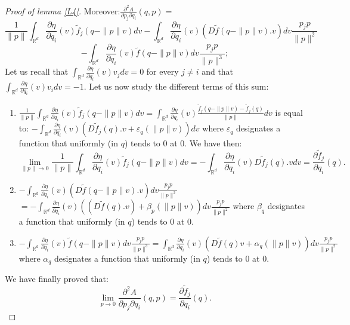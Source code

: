 \documentclass{dcds}
\theoremstyle{definition}
\begin{document}
\begin{proof}[Proof of lemma \ref{L4}]
  Moreover:$\frac{\partial^2A}{\partial p_j\partial q_i}(q,p)=$
$$ \frac{1}{\| p\|} \int_{{\mathbb {R}}^d}\frac{\partial\eta}{\partial q_i}(v)\tilde f_j(q-\| p\| v)dv-\int_{{\mathbb {R}}^d}\frac{\partial \eta}{\partial q_i}(v)(D\tilde f (q-\| p\|v).v)dv \frac{p_jp}{\| p\|^2}$$$$- \int_{{\mathbb {R}}^d}\frac{\partial\eta}{\partial q_i}(v)\tilde f(q-\| p\| v)dv\frac{p_jp}{\| p\|^3};$$
 Let us recall that
$\int_{{\mathbb {R}}^d}\frac{\partial \eta}{\partial q_i}(v)v_jdv=0$ for every $j\not=i$ and that $\int_{{\mathbb {R}}^d}\frac{\partial \eta}{\partial q_i}(v)v_idv=-1$. Let us now study the different terms of this sum:
\begin{enumerate}
\item $ \displaystyle{ \frac{1}{\| p\|} \int_{{\mathbb {R}}^d}\frac{\partial\eta}{\partial q_i}(v)\tilde f_j(q-\| p\| v)dv=   \int_{{\mathbb {R}}^d}\frac{\partial\eta}{\partial q_i}(v)\frac{\tilde f_j(q-\| p\| v)-\tilde f_j(q)}{\| p\|}dv}
$ is equal to:\break
$\displaystyle{-\int_{{\mathbb {R}}^d}\frac{\partial\eta}{\partial q_i}(v)  \left(D\tilde f_j(q).v+\varepsilon_q (\|p\| v) \right) dv
}$ where $\varepsilon_q$ designates a function that uniformly (in $q$) tends to $0$ at $0$. We have then:
$$\lim_{\| p\|\rightarrow 0}\frac{1}{\| p\|} \int_{{\mathbb {R}}^d}\frac{\partial\eta}{\partial q_i}(v)\tilde f_j(q-\| p\| v)dv=
-\int_{{\mathbb {R}}^d}\frac{\partial\eta}{\partial q_i}(v)   D\tilde f_j(q).v dv=\frac{\partial \tilde f_j}{\partial q_i}(q).$$
\item$\displaystyle{-\int_{{\mathbb {R}}^d}\frac{\partial \eta}{\partial q_i}(v)(D\tilde f (q-\| p\|v).v)dv \frac{p_jp}{\| p\|^2}}$\\$\displaystyle{= -\int_{{\mathbb {R}}^d}\frac{\partial \eta}{\partial q_i}(v)\left ((D\tilde f (q).v) +\beta_p(\| p\| v) \right)dv  \frac{p_jp}{\| p\|^2}}$ where $\beta_q$ designates a function that uniformly (in $q$) tends to $0$ at $0$.

 \item $\displaystyle{- \int_{{\mathbb {R}}^d}\frac{\partial\eta}{\partial q_i}(v)\tilde f(q-\| p\| v)dv\frac{p_jp}{\| p\|^3}=  \int_{{\mathbb {R}}^d}\frac{\partial\eta}{\partial q_i}(v)(D\tilde f(q)v+\alpha_q(\| p\| v))dv\frac{p_jp}{\| p\|^2}}$\break
where $\alpha_q$ designates a function that uniformly (in $q$) tends to $0$ at $0$.
\end{enumerate}
We have finally proved that:
$$\lim_{p\rightarrow 0}\frac{\partial^2A}{\partial p_j\partial q_i}(q,p)=\frac{\partial \tilde f_j}{\partial q_i}(q).$$


\end{proof}
\end{document}
